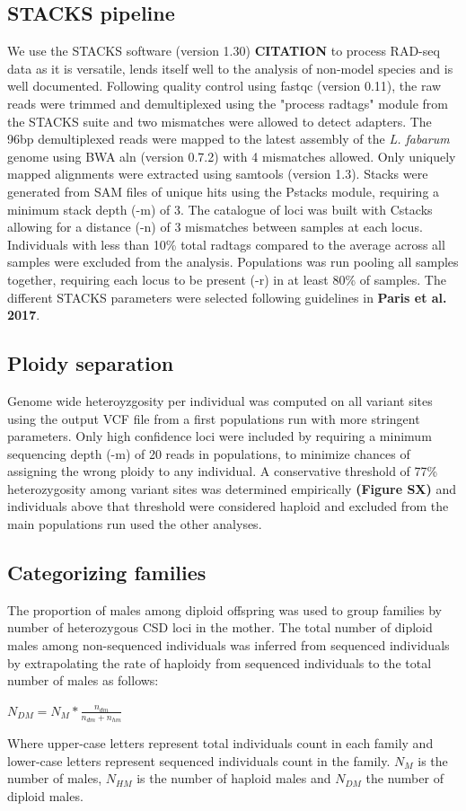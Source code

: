 \documentclass[11pt,a4paper]{report}
\begin{document}
\subsection*{STACKS pipeline}
We use the STACKS software (version 1.30) \textbf{CITATION} to process RAD-seq data as it is versatile, lends itself well to the analysis of non-model species and is well documented.
Following quality control using fastqc (version 0.11), the raw reads were trimmed and demultiplexed using the "process radtags" module from the STACKS suite and two mismatches were allowed to detect adapters. The 96bp demultiplexed reads were mapped to the latest assembly of the \textit{L. fabarum} genome using BWA aln (version 0.7.2) with 4 mismatches allowed. Only uniquely mapped alignments were extracted using samtools (version 1.3). Stacks were generated from SAM files of unique hits using the Pstacks module, requiring a minimum stack depth (-m) of 3. The catalogue of loci was built with Cstacks allowing for a distance (-n) of 3 mismatches between samples at each locus. Individuals with less than 10\% total radtags compared to the average across all samples were excluded from the analysis. Populations was run pooling all samples together, requiring each locus to be present (-r) in at least 80\% of samples. The different STACKS parameters were selected following guidelines in \textbf{Paris et al. 2017}.

\subsection*{Ploidy separation}
Genome wide heteroyzgosity per individual was computed on all variant sites using the output VCF file from a first populations run with more stringent parameters. Only high confidence loci were included by requiring a minimum sequencing depth (-m) of 20 reads in populations, to minimize chances of assigning the wrong ploidy to any individual. A conservative threshold of 77\% heterozygosity among variant sites was determined empirically \textbf{(Figure SX)} and individuals above that threshold were considered haploid and excluded from the main populations run used the other analyses.

\subsection*{Categorizing families}
The proportion of males among diploid offspring was used to group families by number of heterozygous CSD loci in the mother. The total number of diploid males among non-sequenced individuals was inferred from sequenced individuals by extrapolating the rate of haploidy from sequenced individuals to the total number of males as follows:
\begin{center}
$N_{DM}=N_M*\frac{n_{dm}}{n_{dm}+n_{hm}}$\\
\end{center}
Where upper-case letters represent total individuals count in each family and lower-case letters represent sequenced individuals count in the family. $N_M$ is the number of males, $N_{HM}$ is the number of haploid males and $N_{DM}$ the number of diploid males.
\end{document}
